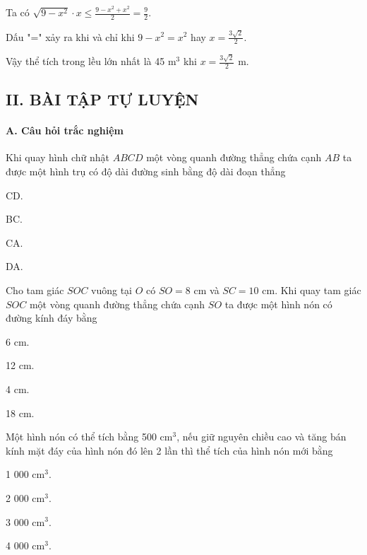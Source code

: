 \documentclass[%
    fontsize=12pt,%
    chapterprefix=false,%
    open=right,%
    twoside=false,%
    numbers=noenddot,%
    headings=optiontohead,%
    final,%
    DIV=15,%
    parskip=half %
]{scrbook}
\begin{document}

Ta có $ \sqrt{9 - x^2} \cdot x \leq \frac{9 - x^2 + x^2}{2} = \frac{9}{2} $.

Dấu "=" xảy ra khi và chỉ khi $ 9 - x^2 = x^2 $ hay $ x = \frac{3\sqrt{2}}{2} $.

Vậy thể tích trong lều lớn nhất là 45 m$^3$ khi $ x = \frac{3\sqrt{2}}{2} $ m.
\subsection{II. BÀI TẬP TỰ LUYỆN}
\paragraph{A. Câu hỏi trắc nghiệm}

\begin{tracnghiem}

\item Khi quay hình chữ nhật $ ABCD $ một vòng quanh đường thẳng chứa cạnh $ AB $ ta được một hình trụ có độ dài đường sinh bằng độ dài đoạn thẳng
\begin{options}
  \item CD.
  \item BC.
  \item CA.
  \item DA.
\end{options}

\item Cho tam giác $ SOC $ vuông tại $ O $ có $ SO = 8 $ cm và $ SC = 10 $ cm. Khi quay tam giác $ SOC $ một vòng quanh đường thẳng chứa cạnh $ SO $ ta được một hình nón có đường kính đáy bằng
\begin{options}
  \item 6 cm.
  \item 12 cm.
  \item 4 cm.
  \item 18 cm.
\end{options}

\item Một hình nón có thể tích bằng 500 cm$^3$, nếu giữ nguyên chiều cao và tăng bán kính mặt đáy của hình nón đó lên 2 lần thì thể tích của hình nón mới bằng
\begin{options}
  \item 1 000 cm$^3$.
  \item 2 000 cm$^3$.
  \item 3 000 cm$^3$.
  \item 4 000 cm$^3$.
\end{options}


\end{tracnghiem}
\end{document}
